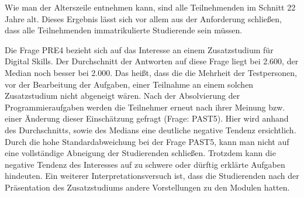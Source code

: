 Wie man der Alterszeile entnehmen kann, sind alle Teilnehmenden im Schnitt 22
Jahre alt. Dieses Ergebnis lässt sich vor allem aus der Anforderung schließen,
dass alle Teilnehmenden immatrikulierte Studierende sein müssen.

Die Frage PRE4 bezieht sich auf das Interesse an einem Zusatzstudium für
Digital Skills. Der Durchschnitt der Antworten auf diese Frage liegt bei 2.600,
der Median noch besser bei 2.000. Das heißt, dass die die Mehrheit der
Testpersonen, vor der Bearbeitung der Aufgaben, einer Teilnahme an einem solchen
Zusatzstudium nicht abgeneigt wären. Nach der Absolvierung der
Programmieraufgaben werden die Teilnehmer erneut nach ihrer Meinung bzw. einer
Änderung dieser Einschätzung gefragt (Frage: PAST5). Hier wird anhand des
Durchschnitts, sowie des Medians eine deutliche negative Tendenz ersichtlich.
Durch die hohe Standardabweichung bei der Frage PAST5, kann man nicht auf eine
vollständige Abneigung der Studierenden schließen. Trotzdem kann die negative
Tendenz des Interesses auf zu schwere oder dürftig erklärte Aufgaben hindeuten.
Ein weiterer Interpretationsversuch ist, dass die Studierenden nach der
Präsentation des Zusatzstudiums andere Vorstellungen zu den Modulen hatten.